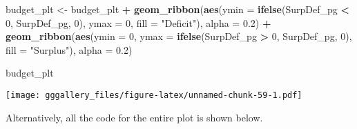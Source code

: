 \documentclass[]{book}
\newenvironment{Shaded}{\begin{snugshade}}{\end{snugshade}}
\newcommand{\DataTypeTok}[1]{\textcolor[rgb]{0.13,0.29,0.53}{#1}}
\newcommand{\DecValTok}[1]{\textcolor[rgb]{0.00,0.00,0.81}{#1}}
\newcommand{\FloatTok}[1]{\textcolor[rgb]{0.00,0.00,0.81}{#1}}
\newcommand{\KeywordTok}[1]{\textcolor[rgb]{0.13,0.29,0.53}{\textbf{#1}}}
\newcommand{\NormalTok}[1]{#1}
\newcommand{\OperatorTok}[1]{\textcolor[rgb]{0.81,0.36,0.00}{\textbf{#1}}}
\newcommand{\StringTok}[1]{\textcolor[rgb]{0.31,0.60,0.02}{#1}}
\begin{document}
\begin{Shaded}
\begin{Highlighting}[]
\NormalTok{budget_plt <-}\StringTok{ }\NormalTok{budget_plt }\OperatorTok{+}\StringTok{ }
\StringTok{  }\KeywordTok{geom_ribbon}\NormalTok{(}\KeywordTok{aes}\NormalTok{(}\DataTypeTok{ymin =} \KeywordTok{ifelse}\NormalTok{(SurpDef_pg }\OperatorTok{<}\StringTok{ }\DecValTok{0}\NormalTok{, SurpDef_pg, }\DecValTok{0}\NormalTok{), }
                  \DataTypeTok{ymax =} \DecValTok{0}\NormalTok{, }
                  \DataTypeTok{fill =} \StringTok{"Deficit"}\NormalTok{), }\DataTypeTok{alpha =} \FloatTok{0.2}\NormalTok{) }\OperatorTok{+}
\StringTok{  }\KeywordTok{geom_ribbon}\NormalTok{(}\KeywordTok{aes}\NormalTok{(}\DataTypeTok{ymin =} \DecValTok{0}\NormalTok{,}
                  \DataTypeTok{ymax =} \KeywordTok{ifelse}\NormalTok{(SurpDef_pg }\OperatorTok{>}\StringTok{ }\DecValTok{0}\NormalTok{, SurpDef_pg, }\DecValTok{0}\NormalTok{), }
                  \DataTypeTok{fill =} \StringTok{"Surplus"}\NormalTok{), }\DataTypeTok{alpha =} \FloatTok{0.2}\NormalTok{) }
  

\NormalTok{budget_plt}
\end{Highlighting}
\end{Shaded}

\texttt{[image: gggallery\_files/figure-latex/unnamed-chunk-59-1.pdf]}

Alternatively, all the code for the entire plot is shown below.
\end{document}
